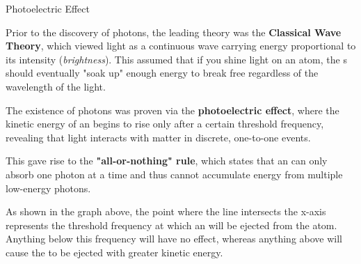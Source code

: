 \documentclass[10pt]{article}
\begin{document}
    \begin{core}{Photoelectric Effect}

      Prior to the discovery of photons, the leading theory was the \textbf{Classical Wave Theory}, which viewed light as a continuous wave carrying energy proportional to its intensity (\textit{brightness}). This assumed that if you shine light on an atom, the s should eventually "soak up" enough energy to break free regardless of the wavelength of the light.

      The existence of photons was proven via the \textbf{photoelectric effect}, where the kinetic energy of an  begins to rise only after a certain threshold frequency, revealing that light interacts with matter in discrete, one-to-one events. 


      This gave rise to the \textbf{"all-or-nothing" rule}, which states that an  can only absorb one photon at a time and thus cannot accumulate energy from multiple low-energy photons.

      As shown in the graph above, the point where the line intersects the x-axis represents the threshold frequency at which an  will be ejected from the atom. Anything below this frequency will have no effect, whereas anything above will cause the  to be ejected with greater kinetic energy.

    \end{core}
\end{document}
